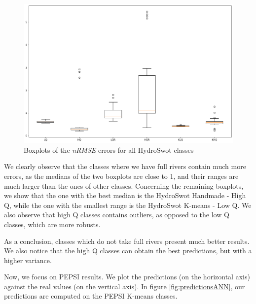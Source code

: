 \begin{figure}[H]
    \centering
    \includegraphics[scale = 0.3]{Graph/MonteCarlo_hydro.png}
    \caption{Boxplots of the \textit{nRMSE} errors for all HydroSwot classes}
    \label{fig:MontecarloHydro}
\end{figure}

 We clearly observe that the classes where we have full rivers contain much more errors, as the medians of the two boxplots are close to 1, and their ranges are much larger than the ones of other classes. Concerning the remaining boxplots, we show that the one with the best median is the HydroSwot Handmade - High Q, while the one with the smallest range is the HydroSwot K-means - Low Q. We also observe that high Q classes contains outliers, as opposed to the low Q classes, which are more robusts.

As a conclusion, classes which do not take full rivers present much better results. We also notice that the high Q classes can obtain the best predictions, but with a higher variance.


Now, we focus on PEPSI results. We plot the predictions (on the horizontal axis) against the real values (on the vertical axis). In figure \ref{fig:predictionsANN}, our predictions are computed on the PEPSI K-means classes.

